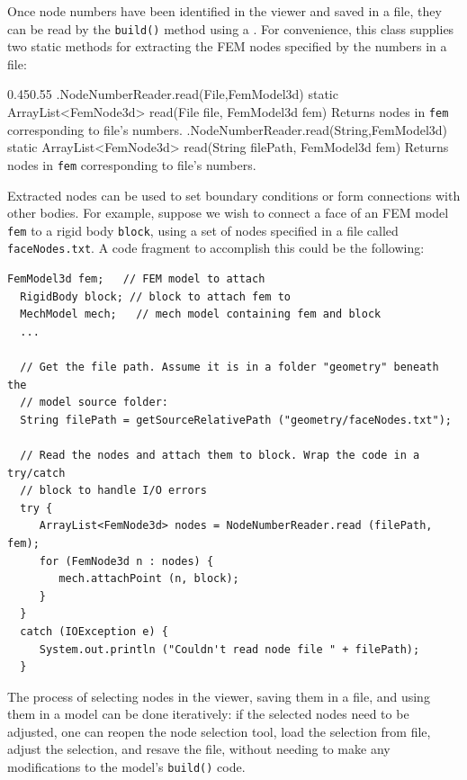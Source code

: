 Once node numbers have been identified in the viewer and saved in a
file, they can be read by the {\tt build()} method using
a .  For
convenience, this class supplies two static methods for extracting the
FEM nodes specified by the numbers in a file:
%
\begin{methodtable}[4pt]{0.45}{0.55}
\midline
%
\methodentry
{\fem.NodeNumberReader.read(File,FemModel3d)}%
{static ArrayList<FemNode3d> read(\brh File file, FemModel3d fem)}%
{Returns nodes in {\tt fem} corresponding to file's numbers.}%
%
\methodentry
{\fem.NodeNumberReader.read(String,FemModel3d)}%
{static ArrayList<FemNode3d> read(\brh String filePath, FemModel3d fem)}%
{Returns nodes in {\tt fem} corresponding to file's numbers.}%
%
\midline
\end{methodtable}
%
Extracted nodes can be used to set boundary conditions or form
connections with other bodies. For example, suppose we wish to connect
a face of an FEM model {\tt fem} to a rigid body {\tt block}, using a
set of nodes specified in a file called {\tt faceNodes.txt}.  A code
fragment to accomplish this could be the following:
%
\begin{lstlisting}[]
  FemModel3d fem;   // FEM model to attach
  RigidBody block; // block to attach fem to
  MechModel mech;   // mech model containing fem and block
  ...

  // Get the file path. Assume it is in a folder "geometry" beneath the
  // model source folder:
  String filePath = getSourceRelativePath ("geometry/faceNodes.txt");

  // Read the nodes and attach them to block. Wrap the code in a try/catch 
  // block to handle I/O errors
  try {
     ArrayList<FemNode3d> nodes = NodeNumberReader.read (filePath, fem);
     for (FemNode3d n : nodes) {
        mech.attachPoint (n, block);
     }
  }
  catch (IOException e) {
     System.out.println ("Couldn't read node file " + filePath);
  }
\end{lstlisting}
%

The process of selecting nodes in the viewer, saving them in a file,
and using them in a model can be done iteratively: if the selected
nodes need to be adjusted, one can reopen the node selection tool, load the
selection from file, adjust the selection, and resave the file,
without needing to make any modifications to the model's {\tt build()}
code.

